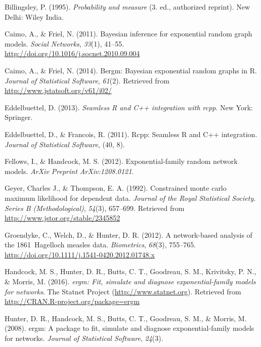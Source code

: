 \documentclass[12pt,twoside]{reedthesis}
\theoremstyle{definition}
\theoremstyle{definition}
\theoremstyle{remark}
\begin{document}

\noindent

\setlength{\parindent}{-0.20in} \setlength{\leftskip}{0.20in}
\setlength{\parskip}{8pt}

\hypertarget{refs}{}
\hypertarget{ref-Billingsley1995}{}
Billingsley, P. (1995). \emph{Probability and measure} (3. ed.,
authorized reprint). New Delhi: Wiley India.

\hypertarget{ref-Caimo2011}{}
Caimo, A., \& Friel, N. (2011). Bayesian inference for exponential
random graph models. \emph{Social Networks}, \emph{33}(1), 41--55.
\url{http://doi.org/10.1016/j.socnet.2010.09.004}

\hypertarget{ref-Caimo2014}{}
Caimo, A., \& Friel, N. (2014). Bergm: Bayesian exponential random
graphs in R. \emph{Journal of Statistical Software}, \emph{61}(2).
Retrieved from \url{http://www.jstatsoft.org/v61/i02/}

\hypertarget{ref-Eddelbuettel2013}{}
Eddelbuettel, D. (2013). \emph{Seamless R and C++ integration with
rcpp}. New York: Springer.

\hypertarget{ref-Eddelbuettel2011}{}
Eddelbuettel, D., \& Francois, R. (2011). Rcpp: Seamless R and C++
integration. \emph{Journal of Statistical Software}, (40, 8).

\hypertarget{ref-Fellows2012}{}
Fellows, I., \& Handcock, M. S. (2012). Exponential-family random
network models. \emph{ArXiv Preprint ArXiv:1208.0121}.

\hypertarget{ref-Geyer1992}{}
Geyer, Charles J., \& Thompson, E. A. (1992). Constrained monte carlo
maximum likelihood for dependent data. \emph{Journal of the Royal
Statistical Society. Series B (Methodological)}, \emph{54}(3), 657--699.
Retrieved from \url{http://www.jstor.org/stable/2345852}

\hypertarget{ref-Groendyke2012}{}
Groendyke, C., Welch, D., \& Hunter, D. R. (2012). A network-based
analysis of the 1861~Hagelloch measles data. \emph{Biometrics},
\emph{68}(3), 755--765.
\url{http://doi.org/10.1111/j.1541-0420.2012.01748.x}

\hypertarget{ref-Handcock2016a}{}
Handcock, M. S., Hunter, D. R., Butts, C. T., Goodreau, S. M.,
Krivitsky, P. N., \& Morris, M. (2016). \emph{ergm: Fit, simulate and
diagnose exponential-family models for networks}. The Statnet Project
(\url{http://www.statnet.org}). Retrieved from
\url{http://CRAN.R-project.org/package=ergm}

\hypertarget{ref-Hunter2008}{}
Hunter, D. R., Handcock, M. S., Butts, C. T., Goodreau, S. M., \&
Morris, M. (2008). ergm: A package to fit, simulate and diagnose
exponential-family models for networks. \emph{Journal of Statistical
Software}, \emph{24}(3).
\end{document}
